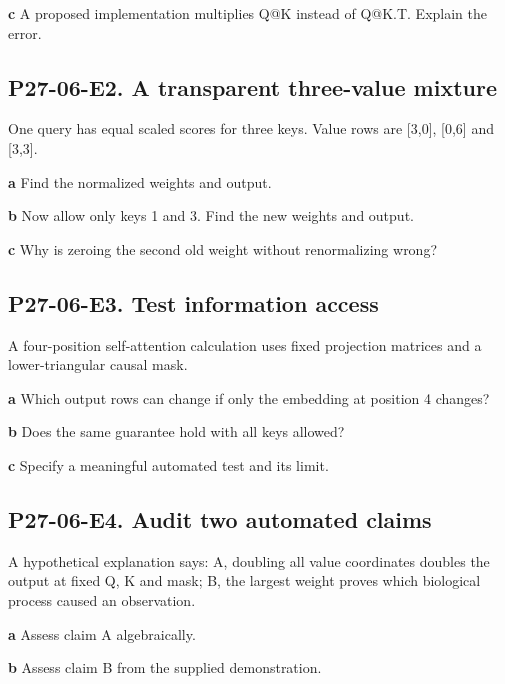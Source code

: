 \documentclass[11pt,letterpaper]{article}
\theoremstyle{definition}\newtheorem{definition}{Definition}\newtheorem{example}{Example}
\numberwithin{equation}{section}
\begin{document}
\textbf{c} A proposed implementation multiplies Q@K instead of Q@K.T. Explain the error.

\par\noindent\begin{minipage}{\linewidth}
\subsection*{P27-06-E2. A transparent three-value mixture}
One query has equal scaled scores for three keys. Value rows are [3,0], [0,6] and [3,3].

\textbf{a} Find the normalized weights and output.

\end{minipage}\par\medskip
\textbf{b} Now allow only keys 1 and 3. Find the new weights and output.

\textbf{c} Why is zeroing the second old weight without renormalizing wrong?

\par\noindent\begin{minipage}{\linewidth}
\subsection*{P27-06-E3. Test information access}
A four-position self-attention calculation uses fixed projection matrices and a lower-triangular causal mask.

\textbf{a} Which output rows can change if only the embedding at position 4 changes?

\end{minipage}\par\medskip
\textbf{b} Does the same guarantee hold with all keys allowed?

\textbf{c} Specify a meaningful automated test and its limit.

\par\noindent\begin{minipage}{\linewidth}
\subsection*{P27-06-E4. Audit two automated claims}
A hypothetical explanation says: A, doubling all value coordinates doubles the output at fixed Q, K and mask; B, the largest weight proves which biological process caused an observation.

\textbf{a} Assess claim A algebraically.

\end{minipage}\par\medskip
\textbf{b} Assess claim B from the supplied demonstration.
\end{document}
